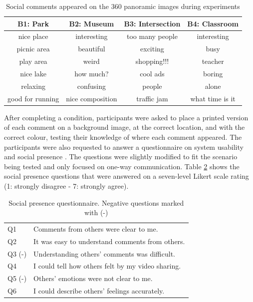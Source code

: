 \begin{table}[h]
  \centering
  \caption{Social comments appeared on the 360 panoramic images during experiments}
  \label{table:mgia16:comment}
  \begin{tabular}{ |c|c|c|c| } 
\hline
    B1: Park    & B2: Museum  &   B3: Intersection    &  B4: Classroom\\
\hline
    nice place  &   interesting &  too many people & interesting \\
    picnic area &   beautiful   &  exciting  & busy \\
    play area   &   weird   &  shopping!!! & teacher \\
    nice lake   &   how much?    &  cool ads    & boring \\
    relaxing    &   confusing   &  people    & alone \\
    good for running    &   nice composition    &  traffic jam & what time is it\\\hline
  \end{tabular}
\end{table}

After completing a condition, participants were asked to place a printed version of each comment on a background image, at the correct location, and with the correct colour, testing their knowledge of where each comment appeared. The participants were also requested to answer a questionnaire on system usability \cite{brooke1996sus} and social presence \cite{Harms2004}. The questions were slightly modified to fit the scenario being tested and only focused on one-way communication. Table \ref{table:social_questions} shows the social presence questions that were answered on a seven-level Likert scale rating (1: strongly disagree - 7: strongly agree). 

\begin{table}[h]
  \centering
  \caption{Social presence questionnaire. Negative questions marked with (-)}
  \label{table:social_questions}
  \begin{tabular}{ll}
    Q1 & Comments from others were clear to me.          \\
    Q2 & It was easy to understand comments from others. \\
    Q3 (-) & Understanding others' comments was difficult.  \\
    Q4 & I could tell how others felt by my video sharing.\\
    Q5 (-) & Others' emotions were not clear to me.\\
    Q6 & I could describe others' feelings accurately.
  \end{tabular}
\end{table}

